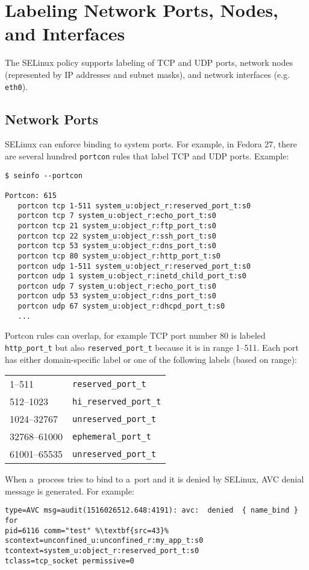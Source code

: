 \section{Labeling Network Ports, Nodes, and Interfaces}
\label{networkobjects}
The SELinux policy supports labeling of TCP and UDP ports, network nodes
(represented by IP addresses and subnet masks), and network interfaces (e.g.
\texttt{eth0}).

\subsection{Network Ports}
SELinux can enforce binding to system ports. For example, in Fedora 27, there
are several hundred \texttt{portcon} rules that label TCP and UDP ports.
Example:
\begin{lstlisting}
$ seinfo --portcon

Portcon: 615
   portcon tcp 1-511 system_u:object_r:reserved_port_t:s0
   portcon tcp 7 system_u:object_r:echo_port_t:s0
   portcon tcp 21 system_u:object_r:ftp_port_t:s0
   portcon tcp 22 system_u:object_r:ssh_port_t:s0
   portcon tcp 53 system_u:object_r:dns_port_t:s0
   portcon tcp 80 system_u:object_r:http_port_t:s0
   portcon udp 1-511 system_u:object_r:reserved_port_t:s0
   portcon udp 1 system_u:object_r:inetd_child_port_t:s0
   portcon udp 7 system_u:object_r:echo_port_t:s0
   portcon udp 53 system_u:object_r:dns_port_t:s0
   portcon udp 67 system_u:object_r:dhcpd_port_t:s0
   ...
\end{lstlisting}
Portcon rules can overlap, for example TCP port number 80 is labeled
\texttt{http\_port\_t} but also \texttt{reserved\_port\_t} because it is in range
1--511. Each port has either domain-specific label or one of the following
labels (based on range):

\begin{tabular}{l l}
    1--511 & \texttt{reserved\_port\_t} \\
    512--1023 & \texttt{hi\_reserved\_port\_t} \\
    1024--32767 & \texttt{unreserved\_port\_t} \\
    32768--61000 & \texttt{ephemeral\_port\_t} \\
    61001--65535 & \texttt{unreserved\_port\_t} \\
\end{tabular}

\pagebreak

When a~process tries to bind to a~port and it is denied by SELinux, AVC denial
message is generated. For example:
\begin{lstlisting}[escapechar=\%]
type=AVC msg=audit(1516026512.648:4191): avc:  denied  { name_bind } for
pid=6116 comm="test" %\textbf{src=43}% scontext=unconfined_u:unconfined_r:my_app_t:s0
tcontext=system_u:object_r:reserved_port_t:s0
tclass=tcp_socket permissive=0
\end{lstlisting}

